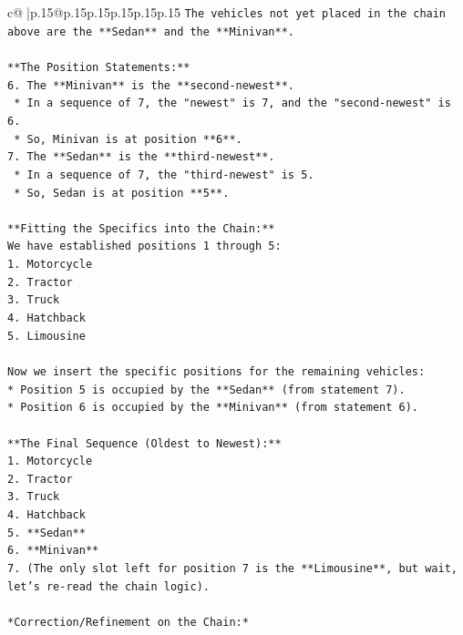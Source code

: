 \documentclass{article}
\begin{document}
{\begin{supertabular}{c@{$\;$}|p{.15\linewidth}@{}p{.15\linewidth}p{.15\linewidth}p{.15\linewidth}p{.15\linewidth}p{.15\linewidth}}
{{{\texttt{The vehicles not yet placed in the chain above are the **Sedan** and the **Minivan**.} \\
\\ 
\texttt{**The Position Statements:**} \\
\texttt{6.  The **Minivan** is the **second{-}newest**.} \\
\texttt{    *   In a sequence of 7, the "newest" is 7, and the "second{-}newest" is 6.} \\
\texttt{    *   So, Minivan is at position **6**.} \\
\texttt{7.  The **Sedan** is the **third{-}newest**.} \\
\texttt{    *   In a sequence of 7, the "third{-}newest" is 5.} \\
\texttt{    *   So, Sedan is at position **5**.} \\
\\ 
\texttt{**Fitting the Specifics into the Chain:**} \\
\texttt{We have established positions 1 through 5:} \\
\texttt{1.  Motorcycle} \\
\texttt{2.  Tractor} \\
\texttt{3.  Truck} \\
\texttt{4.  Hatchback} \\
\texttt{5.  Limousine} \\
\\ 
\texttt{Now we insert the specific positions for the remaining vehicles:} \\
\texttt{*   Position 5 is occupied by the **Sedan** (from statement 7).} \\
\texttt{*   Position 6 is occupied by the **Minivan** (from statement 6).} \\
\\ 
\texttt{**The Final Sequence (Oldest to Newest):**} \\
\texttt{1.  Motorcycle} \\
\texttt{2.  Tractor} \\
\texttt{3.  Truck} \\
\texttt{4.  Hatchback} \\
\texttt{5.  **Sedan**} \\
\texttt{6.  **Minivan**} \\
\texttt{7.  (The only slot left for position 7 is the **Limousine**, but wait, let's re{-}read the chain logic).} \\
\\ 
\texttt{*Correction/Refinement on the Chain:*} \\
}}}
\end{supertabular}}
\end{document}
